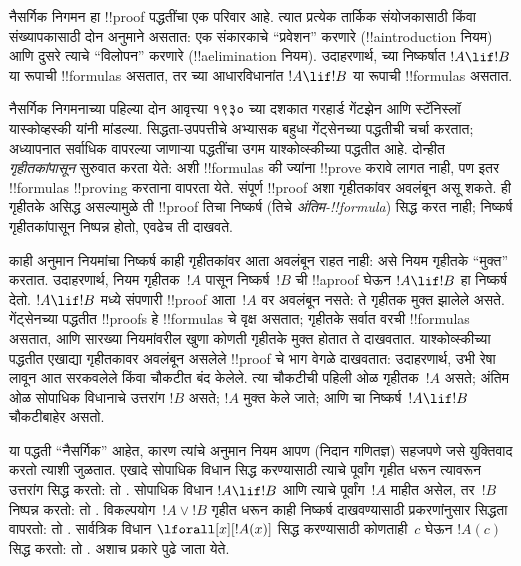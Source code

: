 \documentclass[../../../include/open-logic-section]{subfiles}
\begin{document}


नैसर्गिक निगमन हा !!{proof}
पद्धतींचा एक परिवार आहे.
त्यात प्रत्येक तार्किक संयोजकासाठी
किंवा संख्यापकासाठी दोन
अनुमाने असतात: एक संकारकाचे
“प्रवेशन” करणारे
(!!a{introduction} नियम)
आणि दुसरे त्याचे “विलोपन”
करणारे (!!a{elimination} नियम).
उदाहरणार्थ, \Intro{\lif}
च्या निष्कर्षात
$!A \lif !B$ या रूपाची
!!{formula}s असतात,
तर \Elim{\lif} च्या
आधारविधानांत
$!A \lif !B$ या रूपाची
!!{formula}s असतात.

नैसर्गिक निगमनाच्या
पहिल्या दोन आवृत्त्या
१९३० च्या दशकात गरहार्ड
गेंटझेन आणि स्टॅनिस्लॉ
यास्कोव्हस्की यांनी मांडल्या.
सिद्धता-उपपत्तीचे अभ्यासक
बहुधा गेंट्सेनच्या पद्धतीची
चर्चा करतात; अध्यापनात
सर्वाधिक वापरल्या जाणाऱ्या
पद्धतींचा उगम याश्कोव्स्कीच्या
पद्धतीत आहे. दोन्हीत
\emph{गृहीतकांपासून} सुरुवात
करता येते: अशी !!{formula}s
की ज्यांना !!{prove} करावे
लागत नाही, पण इतर
!!{formula}s !!{proving}
करताना वापरता येते.
संपूर्ण !!{proof} अशा
गृहीतकांवर अवलंबून असू शकते.
ही गृहीतके असिद्ध असल्यामुळे
ती !!{proof} तिचा निष्कर्ष
(तिचे \emph{अंतिम-!!{formula}})
सिद्ध करत नाही; निष्कर्ष
गृहीतकांपासून निष्पन्न होतो,
एवढेच ती दाखवते.

काही अनुमान नियमांचा
निष्कर्ष काही गृहीतकांवर
आता अवलंबून राहत नाही:
असे नियम गृहीतके “मुक्त”
करतात. उदाहरणार्थ,
\Intro{\lif} नियम
गृहीतक~$!A$ पासून
निष्कर्ष~$!B$ ची
!!a{proof} घेऊन
$!A \lif !B$ हा
निष्कर्ष देतो.
$!A \lif !B$ मध्ये
संपणारी !!{proof}
आता~$!A$ वर अवलंबून
नसते: ते गृहीतक
मुक्त झालेले असते.
गेंट्सेनच्या पद्धतीत
!!{proof}s हे
!!{formula}s चे वृक्ष
असतात; गृहीतके सर्वात
वरची !!{formula}s असतात,
आणि \Intro{\lif}
सारख्या नियमांवरील खुणा
कोणती गृहीतके मुक्त होतात
ते दाखवतात.
याश्कोव्स्कीच्या पद्धतीत
एखाद्या गृहीतकावर अवलंबून
असलेले !!{proof} चे भाग
वेगळे दाखवतात: उदाहरणार्थ,
उभी रेषा लावून आत सरकवलेले
किंवा चौकटीत बंद केलेले.
त्या चौकटीची पहिली ओळ
गृहीतक~$!A$ असते;
अंतिम ओळ सोपाधिक विधानाचे
उत्तरांग $!B$ असते;
$!A$ मुक्त केले जाते;
आणि \Intro{\lif} चा
निष्कर्ष~$!A \lif !B$
चौकटीबाहेर असतो.

या पद्धती “नैसर्गिक”
आहेत, कारण त्यांचे अनुमान
नियम आपण (निदान गणितज्ञ)
सहजपणे जसे युक्तिवाद करतो
त्याशी जुळतात. एखादे
सोपाधिक विधान सिद्ध
करण्यासाठी त्याचे पूर्वांग
गृहीत धरून त्यावरून उत्तरांग
सिद्ध करतो: तो \Intro{\lif}.
सोपाधिक विधान $!A \lif !B$
आणि त्याचे पूर्वांग~$!A$
माहीत असेल, तर~$!B$
निष्पन्न करतो: तो
\Elim{\lif}.
विकल्पयोग~$!A \lor !B$
गृहीत धरून काही निष्कर्ष
दाखवण्यासाठी प्रकरणांनुसार
सिद्धता वापरतो: तो
\Elim{\lor}.
सार्वत्रिक विधान
$\lforall[x][!A(x)]$
सिद्ध करण्यासाठी
कोणताही~$c$ घेऊन
$!A(c)$ सिद्ध करतो:
तो \Intro{\lforall}.
अशाच प्रकारे पुढे जाता येते.
\end{document}
